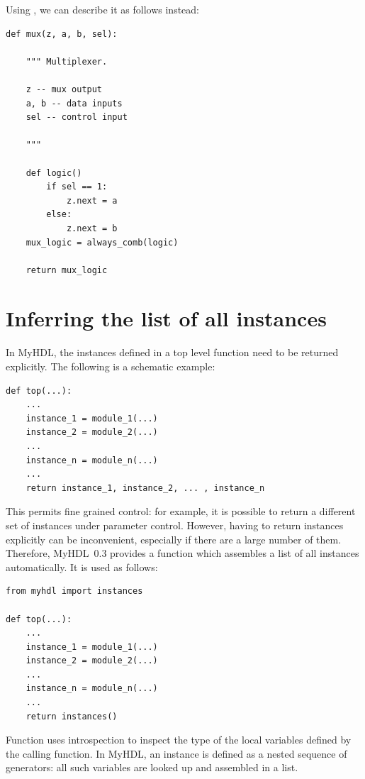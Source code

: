 \documentclass{howto}
\newcommand{\myhdl}{\protect \mbox{MyHDL}}
\begin{document}
Using , we can describe it as follows instead:

\begin{verbatim}
def mux(z, a, b, sel):

    """ Multiplexer.
    
    z -- mux output
    a, b -- data inputs
    sel -- control input

    """

    def logic()
        if sel == 1:
            z.next = a
        else:
            z.next = b
    mux_logic = always_comb(logic)

    return mux_logic
\end{verbatim}


\section{Inferring the list of all instances\label{section-instances}}

In \myhdl{}, the instances defined in a top level function
need to be returned explicitly. The following is a schematic
example:

\begin{verbatim}
def top(...):
    ...
    instance_1 = module_1(...)
    instance_2 = module_2(...)
    ...
    instance_n = module_n(...)
    ... 
    return instance_1, instance_2, ... , instance_n
\end{verbatim}


This permits fine grained control: for example, it
is possible to return a different set of instances
under parameter control. 
However, having to return instances explicitly can be inconvenient,
especially if there are a large number of them. Therefore, \myhdl\ 0.3
provides a function  which assembles a list of
all instances automatically. It is used as follows:

\begin{verbatim}
from myhdl import instances

def top(...):
    ...
    instance_1 = module_1(...)
    instance_2 = module_2(...)
    ...
    instance_n = module_n(...)
    ...
    return instances()
\end{verbatim}

Function  uses introspection to inspect the type
of the local variables defined by the calling function. In \myhdl {},
an instance is defined as a nested sequence of generators: all such
variables are looked up and assembled in a list.
\end{document}
